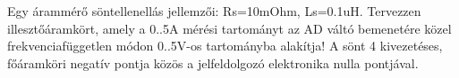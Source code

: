 \begin{example}

Egy árammérő söntellenellás jellemzői: Rs=10mOhm, Ls=0.1uH. Tervezzen illesztőáramkört, amely a 0..5A mérési tartományt az AD váltó bemenetére közel frekvenciafüggetlen módon 0..5V-os tartományba alakítja! A sönt 4 kivezetéses, főáramköri negatív pontja közös a jelfeldolgozó elektronika nulla pontjával.

\tcbline
\vspace{1mm}

\solution

\end{example}